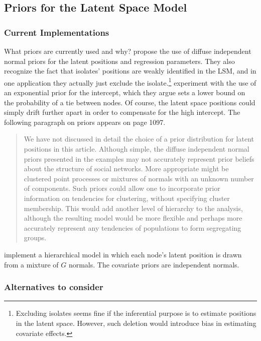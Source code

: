 \documentclass[11pt]{article}
\begin{document}
\subsection{Priors for the Latent Space Model}

\subsubsection{Current Implementations}

What priors are currently used and why? \cite{hoff2002latent} propose the use of diffuse independent normal priors for the latent positions and regression parameters. They also recognize the fact that isolates' positions are weakly identified in the LSM, and in one application they actually just exclude the isolate.\footnote{Excluding isolates seems fine if the inferential purpose is to estimate positions in the latent space. However, such deletion would introduce bias in estimating covariate effects.} \cite{hoff2002latent} experiment with the use of an exponential prior for the intercept, which they argue sets a lower bound on the probability of a tie between nodes. Of course, the latent space positions could simply drift further apart in order to compensate for the high intercept. The following paragraph on priors appears on page 1097.

\begin{quote}
We have not discussed in detail the choice of a prior distribution for latent positions in this article. Although simple, the diffuse independent normal priors presented in the examples may not accurately represent prior beliefs about the structure of social networks. More appropriate might be clustered point processes or mixtures of normals with an unknown number of components. Such priors could allow one to incorporate prior information on tendencies for clustering, without specifying cluster membership. This would add another level of hierarchy to the analysis, although the resulting model would be more flexible and perhaps more accurately represent any tendencies of populations to form segregating groups.
\end{quote}

\citep{Krivitsky2009} implement a hierarchical model in which each node's latent position is drawn from a mixture of $G$ normals. The covariate priors are independent normals.

\subsubsection{Alternatives to consider}
\end{document}
